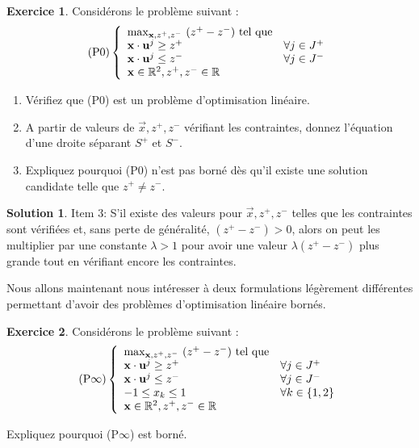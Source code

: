 \documentclass[a4paper,francais]{article}
\newcommand{\R}{{\ensuremath\mathbb{R}}}
\theoremstyle{definition}
\newtheorem{exercice}{Exercice}[section]
\newtheorem*{solution}{Solution}
\begin{document}
\begin{exercice}
  Considérons le problème suivant : 
  \[
  \text{(P0)}
  \left\{
  \begin{array}{ll}
    \max_{\vec{x},z^+,z^-} \ (z^+ - z^-) \ \text{tel que} & \\
    \vec{x} \cdot \vec{u}^j \geq z^+ & \forall j \in J^+ \\ 
    \vec{x} \cdot \vec{u}^j \leq z^- & \forall j \in J^- \\
    \vec{x} \in \R^2, z^+, z^- \in \R \\
  \end{array}
  \right.
  \]

  \begin{enumerate}
  \item Vérifiez que (P0) est un problème d'optimisation linéaire.
  \item A partir de valeurs de $\vec{x}, z^+, z^-$ vérifiant les
    contraintes, donnez l'équation d'une droite séparant $S^+$ et $S^-$. 
  \item Expliquez pourquoi (P0) n'est pas borné dès qu'il existe
    une solution candidate telle que $z^+ \neq z^-$.
  \end{enumerate}

\end{exercice}

\begin{solution}
  Item 3: 
  S'il existe des valeurs pour $\vec{x}, z^+, z^-$ telles que
  les contraintes sont vérifiées et, sans perte de généralité,
  $(z^+ - z^-) > 0$, alors on peut les multiplier par une
  constante $\lambda > 1$ pour avoir une valeur $\lambda(z^+ - z^-)$ plus
  grande tout en vérifiant encore les contraintes. 
\end{solution}

Nous allons maintenant nous intéresser à deux formulations
légèrement différentes permettant d'avoir des problèmes
d'optimisation linéaire bornés.

\begin{exercice}
  Considérons le problème suivant : 
  \[
  \text{(P$\infty$)}
  \left\{
  \begin{array}{ll}
    \max_{\vec{x},z^+,z^-} \ (z^+ - z^-) \ \text{tel que} & \\
    \vec{x} \cdot \vec{u}^j \geq z^+ & \forall j \in J^+ \\ 
    \vec{x} \cdot \vec{u}^j \leq z^- & \forall j \in J^- \\
    -1 \leq x_k \leq 1 & \forall k \in \{1, 2\} \\
    \vec{x} \in \R^2, z^+, z^- \in \R \\
  \end{array}
  \right.
  \]

  Expliquez pourquoi (P$\infty$) est borné. 
\end{exercice}
\end{document}
